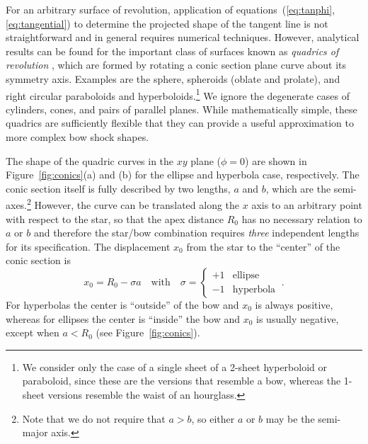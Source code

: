 \documentclass[useAMS, usenatbib, a4paper]{mnras}
\begin{document}
For an arbitrary surface of revolution, application of
equations~(\ref{eq:tanphi}, \ref{eq:tangential}) to determine the
projected shape of the tangent line is not straightforward and in
general requires numerical techniques.  However, analytical results
can be found for the important class of surfaces known as
\textit{quadrics of revolution} \citep{Goldman:1983a, Gfrerrer:2009a},
which are formed by rotating a conic section plane curve about its
symmetry axis.  Examples are the sphere, spheroids (oblate and
prolate), and right circular paraboloids and hyperboloids.\footnote{We
  consider only the case of a single sheet of a 2-sheet hyperboloid or
  paraboloid, since these are the versions that resemble a bow,
  whereas the 1-sheet versions resemble the waist of an hourglass.}
We ignore the degenerate cases of cylinders, cones, and pairs of
parallel planes.  While mathematically simple, these quadrics are
sufficiently flexible that they can provide a useful approximation to
more complex bow shock shapes.



The shape of the quadric curves in the \(xy\) plane (\(\phi = 0\)) are
shown in Figure~\ref{fig:conics}(a) and (b) for the ellipse and
hyperbola case, respectively.  The conic section itself is fully
described by two lengths, \(a\) and \(b\), which are the
semi-axes.\footnote{Note that we do not require that \(a > b\), so
  either \(a\) or \(b\) may be the semi-major axis.}  However, the
curve can be translated along the \(x\) axis to an arbitrary point
with respect to the star, so that the apex distance \(R_0\) has no
necessary relation to \(a\) or \(b\) and therefore the star/bow
combination requires \emph{three} independent lengths for its
specification.  The displacement \(x_0\) from the star to the
``center'' of the conic section is
\begin{equation}
  \label{eq:conic-x0}
  x_0 = R_0 - \sigma a
  \quad \text{with} \quad
  \sigma = \begin{cases}
    +1 & \text{ellipse}\\
    -1 & \text{hyperbola}
  \end{cases} \ .
\end{equation}
For hyperbolas the center is ``outside'' of the bow and \(x_0\) is
always positive, whereas for ellipses the center is ``inside'' the bow
and \(x_0\) is usually negative, except when \(a < R_0\) (see
Figure~\ref{fig:conics}).
\end{document}

